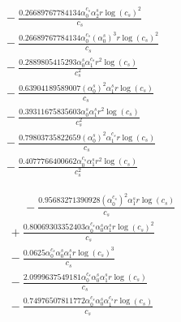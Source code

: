\documentclass[10pt]{article}
\begin{document}
\begin{align*}
&{}  - \frac{0.26689767784134 \alpha_{0}^{c_s} \alpha_{2}^s r \log{\left(c_{s} \right)}^{2}}{c_{s}} \\
&{}  - \frac{0.26689767784134 \alpha_{0}^{c_s} \left(\alpha_{0}^s\right)^{3} r \log{\left(c_{s} \right)}^{2}}{c_{s}} \\
&{}  - \frac{0.2889805415293 \alpha_{0}^s \alpha_{1}^{c_s} r^{2} \log{\left(c_{s} \right)}}{c_{s}^{2}} \\
&{}  - \frac{0.63904189589007 \left(\alpha_{0}^s\right)^{2} \alpha_{1}^s r \log{\left(c_{s} \right)}}{c_{s}} \\
&{}  - \frac{0.39311675835603 \alpha_{0}^s \alpha_{1}^s r^{2} \log{\left(c_{s} \right)}}{c_{s}^{2}} \\
&{}  - \frac{0.79803735822659 \left(\alpha_{0}^s\right)^{2} \alpha_{1}^{c_s} r \log{\left(c_{s} \right)}}{c_{s}} \\
&{}  - \frac{0.4077766400662 \alpha_{0}^{c_s} \alpha_{1}^s r^{2} \log{\left(c_{s} \right)}}{c_{s}^{2}}
\end{align*}

\begin{align*}
\phantom{R_{1,5}} &\phantom{={}}{}  - \frac{0.95683271390928 \left(\alpha_{0}^{c_s}\right)^{2} \alpha_{1}^s r \log{\left(c_{s} \right)}}{c_{s}} \\
&{}  + \frac{0.80069303352403 \alpha_{0}^{c_s} \alpha_{0}^s \alpha_{1}^s r \log{\left(c_{s} \right)}^{2}}{c_{s}} \\
&{}  - \frac{0.0625 \alpha_{0}^{c_s} \alpha_{0}^s \alpha_{1}^s r \log{\left(c_{s} \right)}^{3}}{c_{s}} \\
&{}  - \frac{2.0999637549181 \alpha_{0}^{c_s} \alpha_{0}^s \alpha_{1}^s r \log{\left(c_{s} \right)}}{c_{s}} \\
&{}  - \frac{0.74976507811772 \alpha_{0}^{c_s} \alpha_{0}^s \alpha_{1}^{c_s} r \log{\left(c_{s} \right)}}{c_{s}}
\end{align*}
\end{document}
